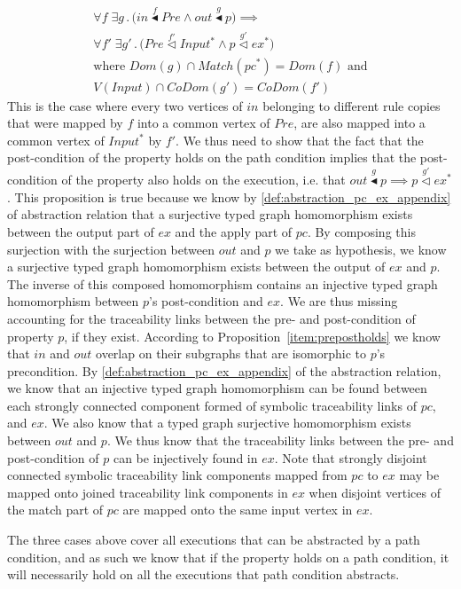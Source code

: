 \begin{pf}
\begin{enumerate}
\begin{multline}
\label{item:prepostholds}
\forall f\; \exists g\,.\,\big(in\stackrel{f}{\blacktriangleleft} Pre \land out \stackrel{g}\blacktriangleleft p\big) \implies \\\forall f'\; \exists g'\,.\,\big(Pre \stackrel{f'}{\vartriangleleft} Input^{*} \land p \stackrel{g'}{\vartriangleleft} ex^*\big)\\
\text{where } Dom(g)\cap Match(pc^{*}) = Dom(f) \text{ and}\\
V(Input)\cap CoDom(g') = CoDom(f')
\end{multline}
This is the case where every two vertices of $in$ belonging to different rule copies that were mapped by $f$ into a common vertex of $Pre$, are also mapped into a common vertex of $Input^{*}$ by $f'$. We thus need to show that the fact that the post-condition of the property holds on the path condition implies that the post-condition of the property also holds on the execution, i.e. that $out \stackrel{g}\blacktriangleleft p \implies p \stackrel{g'}{\vartriangleleft} ex^*$. This proposition is true because we know by \cref{def:abstraction_pc_ex_appendix} of abstraction relation that a surjective typed graph homomorphism exists between the output part of $ex$ and the apply part of $pc$. By composing this surjection with the surjection between $out$ and $p$ we take as hypothesis, we know a surjective typed graph homomorphism exists between the output of $ex$ and $p$. The inverse of this composed homomorphism contains an injective typed graph homomorphism between $p$'s post-condition and $ex$. We are thus missing accounting for the traceability links between the pre- and post-condition of property $p$, if they exist.  According to Proposition~\ref{item:prepostholds} we know that $in$ and $out$ overlap on their subgraphs that are isomorphic to $p$'s precondition. By \cref{def:abstraction_pc_ex_appendix} of the abstraction relation, we know that an injective typed graph homomorphism can be found between each strongly connected component formed of symbolic traceability links of $pc$, and $ex$. We also know that a typed graph surjective homomorphism exists between $out$ and $p$. We thus know that the traceability links between the pre- and post-condition of $p$ can be injectively found in $ex$. Note that strongly disjoint connected symbolic traceability link components mapped from $pc$ to $ex$ may be mapped onto joined traceability link components in $ex$ when disjoint vertices of the match part of $pc$ are mapped onto the same input vertex in $ex$. 
\end{enumerate}

The three cases above cover all executions that can be abstracted by a path condition, and as such we know that if the property holds on a path condition, it will necessarily hold on all the executions that path condition abstracts.
\end{pf}

